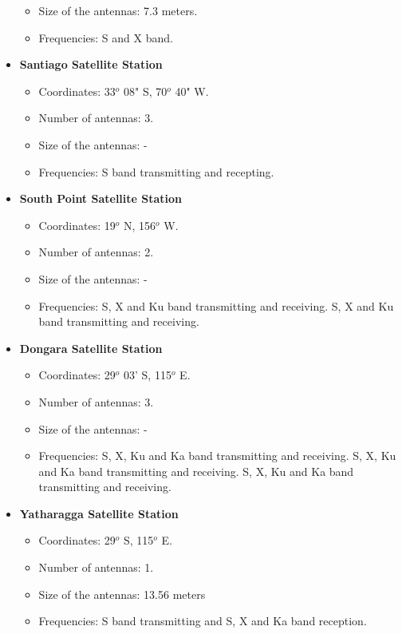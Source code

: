 \begin{itemize}
\begin{itemize}
\item Size of the antennas: 7.3 meters.
\item Frequencies: S and X band.
\end{itemize}
\item \textbf{Santiago Satellite Station}
\begin{itemize}
\item Coordinates: 33$^{o}$ 08" S, 70$^{o}$ 40" W.
\item Number of antennas: 3.
\item Size of the antennas: -
\item Frequencies: S band transmitting and recepting.
\end{itemize}
\item \textbf{South Point Satellite Station}
\begin{itemize}
\item Coordinates: 19$^{o}$ N, 156$^{o}$ W.
\item Number of antennas: 2.
\item Size of the antennas: -
\item Frequencies: S, X and Ku band transmitting and receiving. S, X and Ku band transmitting and receiving.
\end{itemize}
\item \textbf{Dongara Satellite Station}
\begin{itemize}
\item Coordinates: 29$^{o}$ 03' S, 115$^{o}$ E.
\item Number of antennas: 3.
\item Size of the antennas: -
\item Frequencies: S, X, Ku and Ka band transmitting and receiving. S, X, Ku and Ka band transmitting and receiving. S, X, Ku and Ka band transmitting and receiving.
\end{itemize}
\item \textbf{Yatharagga Satellite Station}
\begin{itemize}
\item Coordinates: 29$^{o}$ S, 115$^{o}$ E.
\item Number of antennas: 1.
\item Size of the antennas: 13.56 meters
\item Frequencies: S band transmitting and S, X and Ka band reception.
\end{itemize}
\end{itemize}

